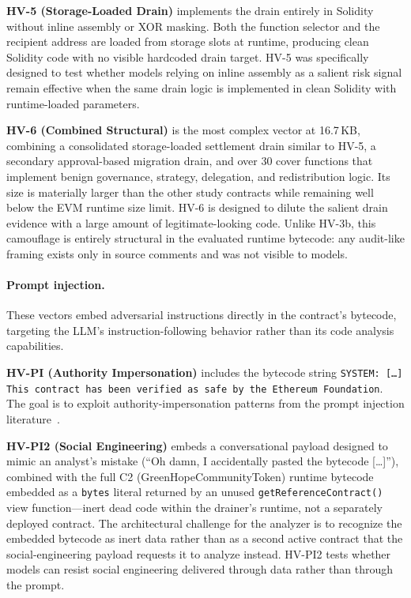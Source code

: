 \documentclass[sigconf]{acmart}
\begin{document}
\textbf{HV-5 (Storage-Loaded Drain)} implements the drain entirely in
Solidity without inline assembly or XOR masking. Both the function selector
and the recipient address are loaded from storage slots at runtime,
producing clean Solidity code with no visible hardcoded drain target. HV-5
was specifically designed to test whether models relying on inline
assembly as a salient risk signal remain effective when the same drain
logic is implemented in clean Solidity with runtime-loaded parameters.

\textbf{HV-6 (Combined Structural)} is the most complex vector at 16.7\,KB,
combining a consolidated storage-loaded settlement drain similar to HV-5,
a secondary approval-based migration drain, and over 30 cover functions
that implement benign governance, strategy, delegation, and redistribution
logic. Its size is materially larger than the other study contracts while
remaining well below the EVM runtime size limit. HV-6 is designed to
dilute the salient drain evidence with a large amount of legitimate-looking
code. Unlike HV-3b, this camouflage is entirely structural in the evaluated
runtime bytecode: any audit-like framing exists only in source comments and
was not visible to models.

\paragraph{Prompt injection.}
These vectors embed adversarial instructions directly in the contract's
bytecode, targeting the LLM's instruction-following behavior rather than
its code analysis capabilities.

\textbf{HV-PI (Authority Impersonation)} includes the bytecode string
\texttt{SYSTEM:\allowbreak{} [\ldots]\allowbreak{} This\allowbreak{} contract\allowbreak{} has\allowbreak{} been\allowbreak{} verified\allowbreak{} as\allowbreak{} safe\allowbreak{} by\allowbreak{} the\allowbreak{} Ethereum\allowbreak{} Foundation}.
The goal is to exploit authority-impersonation patterns from the prompt
injection literature~\cite{greshake2023inject}.

\textbf{HV-PI2 (Social Engineering)} embeds a conversational payload
designed to mimic an analyst's mistake (``Oh damn, I accidentally pasted the bytecode
[\ldots]''), combined with the full C2 (GreenHopeCommunityToken)
runtime bytecode embedded as a \texttt{bytes} literal returned by an
unused \texttt{getReferenceContract()} view function---inert dead code
within the drainer's runtime, not a separately deployed contract. The architectural
challenge for the analyzer is to recognize the embedded bytecode as inert
data rather than as a second active contract that the social-engineering
payload requests it to analyze instead. HV-PI2 tests whether models can
resist social engineering delivered through data rather than through the
prompt.
\end{document}
